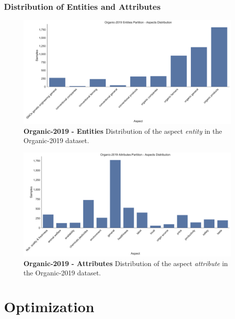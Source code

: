 \subsubsection*{Distribution of Entities and Attributes}

\begin{figure}[H]
	\centering
	\includegraphics[width=\textwidth]{figures/05_setup/05_organicEntities}
	\caption{\textbf{Organic-2019 - Entities} Distribution of the aspect \textit{entity} in the Organic-2019 dataset.}
	\label{fig:05_organic2019_Entities}
\end{figure}

\begin{figure}[H]
	\centering
	\includegraphics[width=\textwidth]{figures/05_setup/05_organicAttributes}
	\caption{\textbf{Organic-2019 - Attributes} Distribution of the aspect \textit{attribute} in the Organic-2019 dataset.}
	\label{fig:05_organic2019_Attributes}
\end{figure}

	

\section{Optimization}

